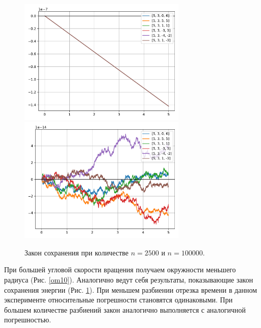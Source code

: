         \begin{figure}[H]
            \centering
            \includegraphics[width=8cm]{pictures/w10_3conv.pdf}
            \includegraphics[width=8cm]{pictures/w10_5conv.pdf}
            \caption{Закон сохранения при количестве \( n = 2500 \) и \( n = 100000 \).}\label{om10conv}
        \end{figure}

        При большей угловой скорости вращения получаем окружности меньшего радиуса (Рис. \ref{om10}). Аналогично ведут себя результаты, показывающие закон сохранения энергии (Рис. \ref{om10conv}). При меньшем разбиении отрезка времени в данном эксперименте относительные погрешности становятся одинаковыми. При большем количестве разбиений закон аналогично выполняется с аналогичной погрешностью.
